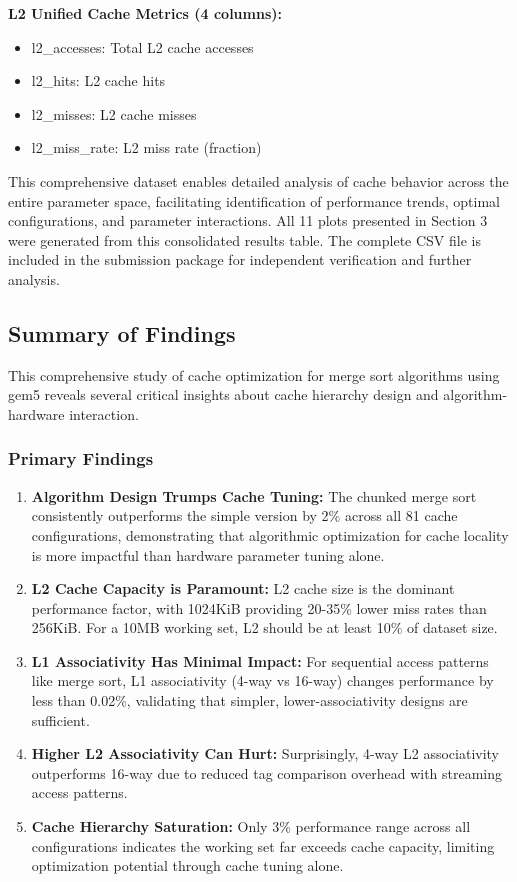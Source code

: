 \documentclass[12pt,a4paper]{article}
\begin{document}
\textbf{L2 Unified Cache Metrics (4 columns):}
\begin{itemize}
    \item l2\_accesses: Total L2 cache accesses
    \item l2\_hits: L2 cache hits
    \item l2\_misses: L2 cache misses
    \item l2\_miss\_rate: L2 miss rate (fraction)
\end{itemize}

This comprehensive dataset enables detailed analysis of cache behavior across the entire parameter space, facilitating identification of performance trends, optimal configurations, and parameter interactions. All 11 plots presented in Section 3 were generated from this consolidated results table. The complete CSV file is included in the submission package for independent verification and further analysis.

\subsection{Summary of Findings}

This comprehensive study of cache optimization for merge sort algorithms using gem5 reveals several critical insights about cache hierarchy design and algorithm-hardware interaction.

\subsubsection{Primary Findings}

\begin{enumerate}
    \item \textbf{Algorithm Design Trumps Cache Tuning:} The chunked merge sort consistently outperforms the simple version by 2\% across all 81 cache configurations, demonstrating that algorithmic optimization for cache locality is more impactful than hardware parameter tuning alone.

    \item \textbf{L2 Cache Capacity is Paramount:} L2 cache size is the dominant performance factor, with 1024KiB providing 20-35\% lower miss rates than 256KiB. For a 10MB working set, L2 should be at least 10\% of dataset size.

    \item \textbf{L1 Associativity Has Minimal Impact:} For sequential access patterns like merge sort, L1 associativity (4-way vs 16-way) changes performance by less than 0.02\%, validating that simpler, lower-associativity designs are sufficient.

    \item \textbf{Higher L2 Associativity Can Hurt:} Surprisingly, 4-way L2 associativity outperforms 16-way due to reduced tag comparison overhead with streaming access patterns.

    \item \textbf{Cache Hierarchy Saturation:} Only 3\% performance range across all configurations indicates the working set far exceeds cache capacity, limiting optimization potential through cache tuning alone.
\end{enumerate}
\end{document}
